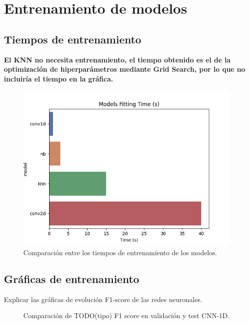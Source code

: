 \section{Entrenamiento de modelos}

  \subsection{Tiempos de entrenamiento}

    \textbf{El KNN no necesita entrenamiento, el tiempo obtenido es el de la optimización de hiperparámetros mediante Grid Search, por lo que no incluiría el tiempo en la gráfica.}

    \begin{figure}[h]
      \centering
      \includegraphics[width=16cm]{archivos/5.Resultados/TiemposEntrenamiento}
      \caption{Comparación entre los tiempos de entrenamiento de los modelos.}
      \label{TiemposEntrenamientoImage}
    \end{figure}

  
  \subsection{Gráficas de entrenamiento}

    Explicar las gráficas de evolución F1-score de las redes neuronales.


    \begin{figure}[h]
        \centering
        
        \caption{Comparación de TODO(tipo) F1 score en validación y test CNN-1D.}
        \label{F1Score1DImage}
     \end{figure}


